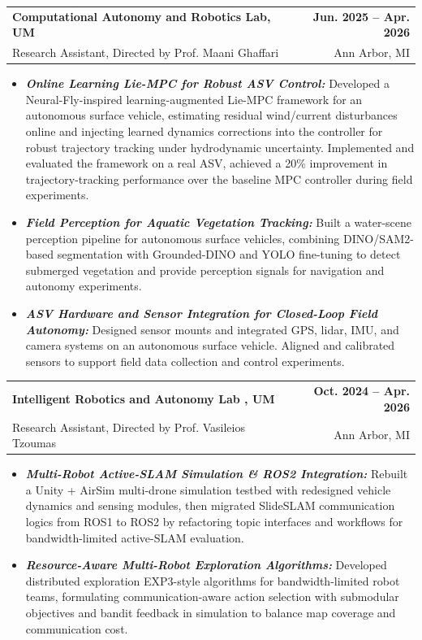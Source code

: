 \documentclass[11pt,letterpaper]{article}
\makeatletter
\newcommand{\resumeSubheading}[4]{
    \begin{tabularx}{\textwidth}{@{}Xr@{}}
        \textbf{#1} & \textbf{#2} \\
        #3 & #4 \\
    \end{tabularx}
}
\newcommand{\resumeItem}[1]{
    \item #1
}
\makeatother
\begin{document}
\resumeSubheading
{Computational Autonomy and Robotics Lab, UM }
{Jun. 2025 -- Apr. 2026}
{\hspace*{1.4em}Research Assistant, Directed by Prof. Maani Ghaffari}
{Ann Arbor, MI}
\begin{itemize}[leftmargin=2.4em, itemsep=0.5pt, topsep=0pt]
    \small
    \resumeItem{\textbf{\textit{Online Learning Lie-MPC for Robust ASV Control:}} Developed a Neural-Fly-inspired learning-augmented Lie-MPC framework for an autonomous surface vehicle, estimating residual wind/current disturbances online and injecting learned dynamics corrections into the controller for robust trajectory tracking under hydrodynamic uncertainty. Implemented and evaluated the framework on a real ASV, achieved a 20\% improvement in trajectory-tracking performance over the baseline MPC controller during field experiments.}
    \resumeItem{\textbf{\textit{Field Perception for Aquatic Vegetation Tracking:}} Built a water-scene perception pipeline for autonomous surface vehicles, combining DINO/SAM2-based segmentation with Grounded-DINO and YOLO fine-tuning to detect submerged vegetation and provide perception signals for navigation and autonomy experiments.}
    \resumeItem{\textbf{\textit{ASV Hardware and Sensor Integration for Closed-Loop Field Autonomy:}} Designed sensor mounts and integrated GPS, lidar, IMU, and camera systems on an autonomous surface vehicle. Aligned and calibrated sensors to support field data collection and control experiments.}
\end{itemize}

\resumeSubheading
{Intelligent Robotics and Autonomy Lab , UM}
{Oct. 2024 -- Apr. 2026}
{\hspace*{1.4em}Research Assistant, Directed by Prof. Vasileios Tzoumas}
{Ann Arbor, MI}
\begin{itemize}[leftmargin=2.4em, itemsep=0.5pt, topsep=0pt]
    \small
    \resumeItem{\textbf{\textit{Multi-Robot Active-SLAM Simulation \& ROS2 Integration:}} Rebuilt a Unity + AirSim multi-drone simulation testbed with redesigned vehicle dynamics and sensing modules, then migrated SlideSLAM communication logics from ROS1 to ROS2 by refactoring topic interfaces and workflows for bandwidth-limited active-SLAM evaluation.}
    \resumeItem{\textbf{\textit{Resource-Aware Multi-Robot Exploration Algorithms:}} Developed distributed exploration EXP3-style algorithms for bandwidth-limited robot teams, formulating communication-aware action selection with submodular objectives and bandit feedback in simulation to balance map coverage and communication cost.}
\end{itemize}
\end{document}
